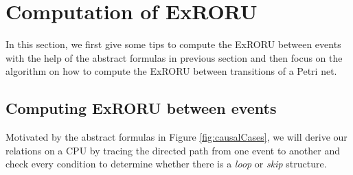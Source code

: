 \documentclass{llncs}
\begin{document}
\begin{table}[htbp]
{\begin{tabular}{|c|c|c|c|c|c|c|c|}
	\end{tabular}
}
\hspace{0.5em}
\end{table}

\section{Computation of ExRORU}\label{sec:computation}
In this section, we first give some tips to compute the ExRORU between events with the help of the abstract formulas in previous section and then focus on the algorithm on how to compute the ExRORU between transitions of a Petri net.

\subsection{Computing ExRORU between events}
Motivated by the abstract formulas in Figure \ref{fig:causalCases}, we will derive our relations on a CPU by tracing the directed path from one event to another and check every condition to determine whether there is a \textit{loop} or \textit{skip} structure.
\end{document}
